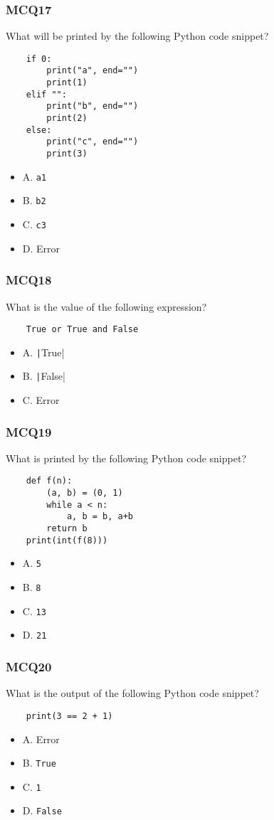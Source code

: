 \documentclass{beamer}
\newcommand{\python}[1]{\texttt|#1|}
\begin{document}
\begin{frame}[fragile]
    \frametitle{MCQ17}
    What will be printed by the following Python code snippet?
    \begin{verbatim}
    if 0:
        print("a", end="")
        print(1)
    elif "":
        print("b", end="")
        print(2)
    else:
        print("c", end="")
        print(3)
    \end{verbatim}
    \begin{itemize}
        \item A. \texttt{a1}
        \item B. \texttt{b2}
        \item C. \texttt{c3}
        \item D. Error
    \end{itemize}
\end{frame}

\begin{frame}[fragile]
    \frametitle{MCQ18}
    What is the value of the following expression?
    \begin{verbatim}
    True or True and False
    \end{verbatim}
    \begin{itemize}
        \item A. \python{True}
        \item B. \python{False}
        \item C. Error
    \end{itemize}
\end{frame}

\begin{frame}[fragile]
    \frametitle{MCQ19}
    What is printed by the following Python code snippet?
    \begin{verbatim}
    def f(n):
        (a, b) = (0, 1)
        while a < n:
            a, b = b, a+b
        return b
    print(int(f(8)))
    \end{verbatim}
    \begin{itemize}
        \item A. \texttt{5}
        \item B. \texttt{8}
        \item C. \texttt{13}
        \item D. \texttt{21}
    \end{itemize}
\end{frame}

\begin{frame}[fragile]
    \frametitle{MCQ20}
    What is the output of the following Python code snippet?
    \begin{verbatim}
    print(3 == 2 + 1)
    \end{verbatim}
    \begin{itemize}
        \item A. Error
        \item B. \texttt{True}
        \item C. \texttt{1}
        \item D. \texttt{False}
    \end{itemize}
\end{frame}
\end{document}
